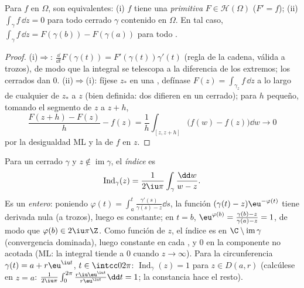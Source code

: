 \begin{proposition}[Primitivas]\label{prop:b3:holomorphic:primitive}
Para $f$  en $\Omega$, son
equivalentes: (i) $f$ tiene una \emph{primitiva}
$F \in \mathcal H(\Omega)$ ($F'
= f$); (ii) $\int_\gamma f\,\dd z = 0$ para todo
 cerrado $\gamma$
contenido en $\Omega$. En tal caso, $\int_\gamma f\,\dd z =
F(\gamma(b)) - F(\gamma(a))$ para todo
.
\end{proposition}

\begin{proof}
(i)$\Rightarrow$: $\frac{\dd}{\dd t}F(\gamma(t)) =
F'(\gamma(t))\gamma'(t)$ (regla de la cadena, válida a trozos), de modo
que la integral se telescopa a la diferencia de los extremos; los
 cerrados dan $0$.
(ii)$\Rightarrow$(i): fíjese $z_*$ en una
, defínase
$F(z) = \int_{\gamma_z}f\,\dd z$ a lo largo de cualquier
 de $z_*$ a $z$ (bien
definida: dos  difieren
en un  cerrado); para $h$
pequeño, tomando el segmento de $z$ a
$z + h$,
\[
\frac{F(z + h) - F(z)}{h} - f(z)
= \frac1h\int_{[z, z+h]}\bigl(f(w) - f(z)\bigr)\dd w
\longrightarrow 0
\]
por la desigualdad ML y la
 de $f$ en $z$.
\end{proof}

\begin{definition}\label{def:b3:holomorphic:index}
Para un  cerrado $\gamma$
y $z \notin
\operatorname{im}\gamma$, el \emph{índice} es
\[
\operatorname{Ind}_\gamma(z) = \frac1{2\iu\pi}
\int_\gamma\frac{\dd w}{w - z} .
\]
Es un \emph{entero}: poniendo $\varphi(t) =
\int_a^t\frac{\gamma'(s)}{\gamma(s) - z}\dd s$, la función
$(\gamma(t) - z)\eu^{-\varphi(t)}$ tiene derivada nula (a trozos), luego
es constante; en $t = b$, $\eu^{\varphi(b)} =
\frac{\gamma(b) - z}{\gamma(a) - z} = 1$, de modo que $\varphi(b) \in
2\iu\pi\Z$. Como función de $z$, el índice es
 en
$\C\setminus\operatorname{im}\gamma$ (convergencia dominada), luego
constante en cada , y $0$ en la componente no acotada (ML: la integral tiende a $0$
cuando $z \to
\infty$). Para la circunferencia $\gamma(t) = a + r\eu^{\iu t}$, $t
\in \intcc0{2\pi}$: $\operatorname{Ind}_\gamma(z) = 1$ para $z
\in D(a,r)$ (calcúlese en $z = a$: $\frac1{2\iu\pi}
\int_0^{2\pi}\frac{r\iu\eu^{\iu t}}{r\eu^{\iu t}}\dd t = 1$; la
constancia hace el resto).
\end{definition}

